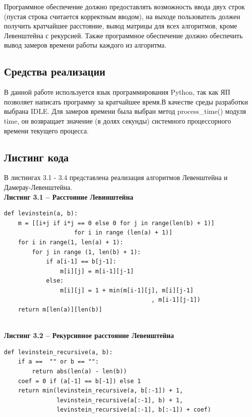 \documentclass[a4paper,12pt]{article}
\begin{document}
\hfill

Программное обеспечение должно предоставлять возможность ввода двух строк (пустая строка считается корректным вводом), на выходе пользователь должен получить кратчайшее расстояние, вывод матрицы для всех алгоритмов, кроме Левенштейна с рекурсией. Также программное обеспечение должно обеспечить вывод замеров времени работы каждого из алгоритма.

\subsection{Средства реализации}

\hfill

В данной работе используется язык программирования Python, так как ЯП позволяет написать программу за кратчайшее время.В качестве среды разработки выбрана IDLE.
Для замеров времени была выбран метод process\_time() модуля time, он возвращает значение (в долях секунды) системного процессорного времени текущего процесса.

\subsection{Листинг кода}

В листингах 3.1 - 3.4 представлена реализация алгоритмов Левенштейна и Дамерау-Левенштейна.
\lstset{ %
	language=Python,                %
	numbers=left,                   %
}
 \textbf{\\Листинг 3.1 -- Расстояние Левинштейна }

\begin{lstlisting}
def levinstein(a, b):
	m = [[i+j if i*j == 0 else 0 for j in range(len(b) + 1)] 
					for i in range (len(a) + 1)]
	for i in range(1, len(a) + 1):
		for j in range (1, len(b) + 1):
			if a[i-1] == b[j-1]:
				m[i][j] = m[i-1][j-1]
			else:
				m[i][j] = 1 + min(m[i-1][j], m[i][j-1]
				                          , m[i-1][j-1])
	return m[len(a)][len(b)]
\end{lstlisting}
 \textbf{\\Листинг 3.2 -- Рекурсивное расстояние Левенштейна }

\begin{lstlisting}
def levinstein_recursive(a, b):
	if a ==  "" or b == "": 
		return abs(len(a) - len(b))
	coef = 0 if (a[-1] == b[-1]) else 1
	return min(levinstein_recursive(a, b[:-1]) + 1,
			   levinstein_recursive(a[:-1], b) + 1,
	           levinstein_recursive(a[:-1], b[:-1]) + coef)
\end{lstlisting}
\end{document}

